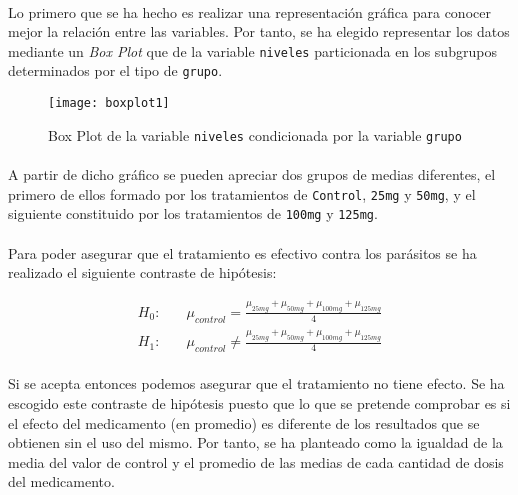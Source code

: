 \documentclass{article}
\begin{document}
      \paragraph{}
      Lo primero que se ha hecho es realizar una representación gráfica para conocer mejor la relación entre las variables. Por tanto, se ha elegido representar los datos mediante un \emph{Box Plot} que de la variable \texttt{niveles} particionada en los subgrupos determinados por el tipo de \texttt{grupo}.

      \begin{figure}[H]
        \centering
        \texttt{[image: boxplot1]}
        \caption{Box Plot de la variable \texttt{niveles} condicionada por la variable \texttt{grupo}}
        \label{fig:figura_1}
      \end{figure}
      \paragraph{}

      \paragraph{}
      A partir de dicho gráfico se pueden apreciar dos grupos de medias diferentes, el primero de ellos formado por los tratamientos de \texttt{Control}, \texttt{25mg} y \texttt{50mg}, y el siguiente constituido por los tratamientos de \texttt{100mg} y \texttt{125mg}.

      \paragraph{}
      Para poder asegurar que el tratamiento es efectivo contra los parásitos se ha realizado el siguiente contraste de hipótesis:

      \begin{align*}
        H_0:& \quad \mu_{control} = \frac{\mu_{25mg} + \mu_{50mg} +\mu_{100mg} +\mu_{125mg}}{4} \\
        H_1:& \quad \mu_{control} \neq \frac{\mu_{25mg} + \mu_{50mg} +\mu_{100mg} +\mu_{125mg}}{4}
      \end{align*}

      \paragraph{}
      Si se acepta entonces podemos asegurar que el tratamiento no tiene efecto. Se ha escogido este contraste de hipótesis puesto que lo que se pretende comprobar es si el efecto del medicamento (en promedio) es diferente de los resultados que se obtienen sin el uso del mismo. Por tanto, se ha planteado como la igualdad de la media del valor de control y el promedio de las medias de cada cantidad de dosis del medicamento.
\end{document}
